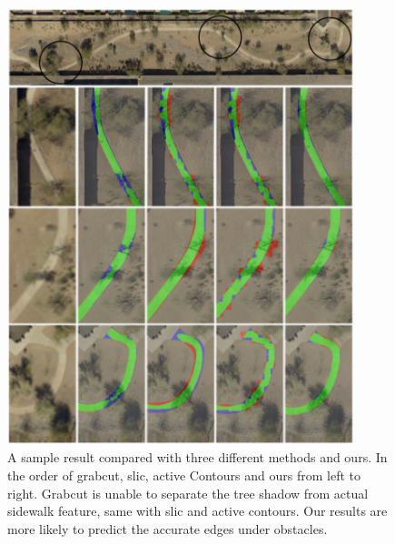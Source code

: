 \begin{figure}
    \centering
    \includegraphics[width=0.9\textwidth]{Figures/4_comparison.pdf}
    \caption[Methods Comparison on Sample Sidewalk 1]{A sample result compared with three different methods and ours. In the order of grabcut, slic, active Contours and ours from left to right. Grabcut is unable to separate the tree shadow from actual sidewalk feature, same with slic and active contours. Our results are more likely to predict the accurate edges under obstacles.}
    \label{fig:Sample_4_compare}
\end{figure}


